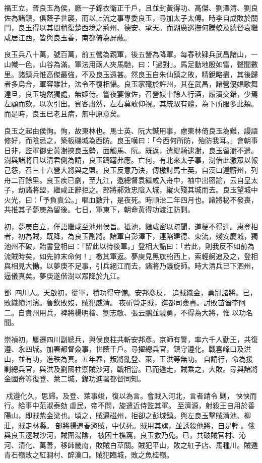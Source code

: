 \begin{pinyinscope}
福王立，晉良玉為侯，廕一子錦衣衛正千戶，且並封黃得功、高傑、劉澤清、劉良佐為諸鎮，俱蔭子世襲，而以上流之事專委良玉，尋加太子太傅。時李自成敗於關門，良玉得以其間稍復楚西境之荊州、德安、承天。而湖廣巡撫何騰蛟及總督袁繼咸居江西，皆與良玉善，南都倚為屏蔽。

良玉兵八十萬，號百萬，前五營為親軍，後五營為降軍。每春秋肄兵武昌諸山，一山幟一色，山谷為滿。軍法用兩人夾馬馳，曰：「過對」。馬足動地殷如雷，聲聞數里。諸鎮兵惟高傑最強，不及良玉遠甚。然良玉自朱仙鎮之敗，精銳略盡，其後歸者多烏合，軍容雖壯，法令不復相懾。良玉家殲於許州，其在武昌，諸營優娼歌舞達旦，良玉塊然獨處，無姬侍。嘗夜宴僚佐，召營妓十餘人行酒，履濆交錯，少焉左顧而欬，以次引出。賓客肅然，左右莫敢仰視。其統馭有體，為下所服多此類。而是時，良玉已老且病，無中原意矣。

良玉之起由侯恂。恂，故東林也。馬士英、阮大鋮用事，慮東林倚良玉為難，謾語修好，而陰忌之，築板磯城為西防。良玉嘆曰：「今西何所防，殆防我耳。」會朝事日非，監軍御史黃澍挾良玉勢，面觸馬、阮。既返，遣緹騎逮澍，良玉留澍不遣。澍與諸將日以清君側為請，良玉躊躇弗應。亡何，有北來太子事，澍借此激眾以報己怨，召三十六營大將與之盟。良玉反意乃決，傳檄討馬士英，自漢口達蘄州，列舟二百餘里。良玉疾已劇，至九江，邀總督袁繼咸入舟中，袖中出密諭，云自皇太子，劫諸將盟，繼咸正辭拒之。部將郝效忠陰入城，縱火殘其城而去。良玉望城中火光，曰：「予負袁公。」嘔血數升，是夜死。時順治二年四月也。諸將秘不發喪，共推其子夢庚為留後。七日，軍東下，朝命黃得功渡江防剿。

初，夢庚自立，佯語繼咸至池州侯旨。抵池，繼咸密以疏聞，道梗不得達。惠登相者，初為賊，既降，為良玉副將。諸軍自彭澤下，連陷建德、東流，殘安慶城，獨池州不破，貽書登相曰：「留此以待後軍。」登相大詬曰：「若此，則我反不如前為流賊時矣，如先帥末命何！」檄其軍返。夢庚見黑旗船西上，索輕舸追及之，登相與相見大慟。以夢庚不足事，引兵絕江而去，諸將乃議旋師。時大清兵已下泗州，逼儀真矣。夢庚遂偕澍以眾降於九江。

鄧，四川人。天啟初，從軍，積功得守備。安邦彥反，追賊織金，勇冠諸將。已，敗織績河濱。魯欽敗歿，賊犯威清。夜斫營走賊，進都司僉書。討敗苗酋李阿二。自貴州用兵，裨將楊明楷、劉志敏、張云鵬並驍勇，不得為大將，惟以功名聞。

崇禎初，屢遷四川副總兵，與侯良柱共斬安邦彥。京師有警，率六千人勤王，共復遵、永四城。加署都督僉事，世蔭千戶。尋擢總兵官，鎮守遵化。戰喜峰口及洪山，並有功，進秩為真。五年春，叛將亂登、萊，王洪等無功。自請行，命為援剿總兵官，與洪及劉國柱禦賊沙河，戰相當。已而遁走，賊乘之，大敗。尋與諸將金國奇等復登、萊二城，錄功進署都督同知。

戍遵化久，思歸。及登、萊事竣，復以為言。會賊入河北，言者請令剿，怏怏而行。給事中范淑泰劾虐民，帝不問，旋遣近侍監其軍。至濟源，射殺王自用於善陽山，即賊紫金梁也。頃之，賊逼磁州，拒卻之彭城鎮。與左良玉擊賊清池、柳莊，賊走林縣。部將楊遇春邀賊，中伏死。賊用其旗，並誘殺他將，自是輕。俄與良玉逐賊沙河，賊圍湯陰，被困土樵窩，良玉救乃免。已，共破賊官村、沁河、清化、萬善，移師畿南，敗賊白草關。賊犯平山，敗之紅子店、馬種川。賊遁青石嶺敗之紅澗村、醉漢口。賊犯臨城，敗之魚桂嶺。


\end{pinyinscope}
